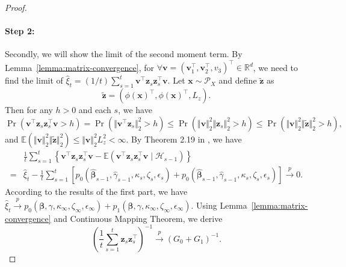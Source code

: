 \documentclass[12pt]{article}
\begin{document}
\begin{proof}
\paragraph{Step 2:} Secondly, we will show the limit of the second moment term. By Lemma~\ref{lemma:matrix-convergence}, for $\forall \bm{v} = (\bm{v}_1^{\top},\bm{v}_2^{\top},v_3)^{\top} \in \mathbb{R}^d$, we need to find the limit of 
$
\widehat{\xi}_t = (1/t)\sum_{s=1}^t \bm{v}^{\top} \bm{z}_s \bm{z}_s^{\top} \bm{v}. $ 
Let $\bm{x} \sim \mathcal{P}_X$ and define $\tilde{\bm{z}}$ as
\begin{equation}
\label{equ15}
    \tilde{\bm{z}} = (\phi(\bm{x})^{\top}, \phi(\bm{x})^{\top}, L_z).
\end{equation}
Then for any $h >0$ and each $s$, we have 
\begin{equation*}
    \Pr(\bm{v}^{\top} \bm{z}_s \bm{z}_s^{\top} \bm{v}>h)
    =\Pr(\Vert \bm{v}^{\top} \bm{z}_s\Vert_2^2 >h) 
    \le \Pr(\Vert \bm{v}\Vert_2^2 \Vert \bm{z}_s \Vert_2^2 >h)
    \le \Pr(\Vert \bm{v}\Vert_2^2 \Vert \tilde{\bm{z}} \Vert_2^2 >h),
\end{equation*}
and $\mathbb{E}(\Vert \bm{v}\Vert_2^2 \Vert \tilde{\bm{z}} \Vert_2^2) \le \Vert \bm{v}\Vert_2^2 L_z^2 < \infty$. By Theorem 2.19 in \cite{hall2014martingale}, we have
\begin{align*}
    &\frac{1}{t}\sum_{s=1}^t \left\{\bm{v}^{\top} \bm{z}_s \bm{z}_s^{\top} \bm{v} - \mathbb{E}(\bm{v}^{\top} \bm{z}_s \bm{z}_s^{\top} \bm{v} \mid \mathcal{H}_{s-1})\right\} \\
    =& \widehat{\xi}_t - \frac{1}{t}\sum_{s=1}^t\left[p_0(\widehat{\bm{\beta}}_{s-1},\widehat{\gamma}_{s-1},\kappa_s,\zeta_s,\epsilon_s)+ p_0(\widehat{\bm{\beta}}_{s-1},\widehat{\gamma}_{s-1},\kappa_s,\zeta_s,\epsilon_s) \right]\stackrel{p}{\to}0.
\end{align*}
According to the results of the first part, we have 
$\widehat{\xi}_t \stackrel{p}{\to} p_0(\bm{\beta},\gamma,\kappa_\infty,\zeta_\infty,\epsilon_\infty) + p_1(\bm{\beta},\gamma,\kappa_\infty,\zeta_\infty,\epsilon_\infty)$.
Using Lemma~\ref{lemma:matrix-convergence} and Continuous Mapping Theorem, we derive 
\begin{equation}
\label{equ16}
    \left(\frac{1}{t} \sum_{s=1}^t \bm{z}_s \bm{z}_s^{\top} \right)^{-1} \stackrel{p}{\to} (G_0+G_1)^{-1}.
\end{equation}


\end{proof}
\end{document}
